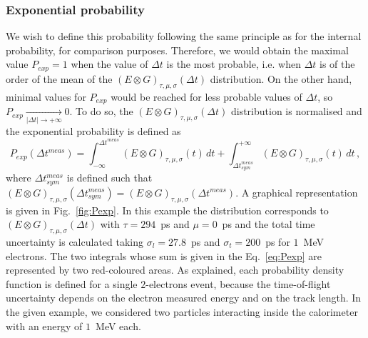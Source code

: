 
\subsubsection{Exponential probability}

We wish to define this probability following the same principle as for the internal probability, for comparison purposes.
Therefore, we would obtain the maximal value ${P_{exp}=1}$ when the value of $\Delta t$ is the most probable, i.e. when $\Delta t$ is of the order of the mean of the ${(E \otimes G)_{\tau,\mu,\sigma}(\Delta t)}$ distribution.
On the other hand, minimal values for $P_{exp}$ would be reached for less probable values of $\Delta t$, so ${P_{exp} \xrightarrow[|\Delta t| \rightarrow +\infty]{} 0}$.
To do so, the ${(E \otimes G)_{\tau,\mu,\sigma}(\Delta t)}$ distribution is normalised and the exponential probability is defined as
\begin{equation}
  P_{exp}(\Delta t^{meas}) = \int_{-\infty}^{\Delta t^{meas}} (E \otimes G)_{\tau,\mu,\sigma}(t)\, dt + \int_{\Delta t_{sym}^{meas}}^{+\infty} (E \otimes G)_{\tau,\mu,\sigma}(t)\, dt\,,
  \label{eq:Pexp}
\end{equation}
where $\Delta t^{meas}_{sym}$ is defined such that ${(E \otimes G)_{\tau,\mu,\sigma}(\Delta t^{meas}_{sym})} = {(E \otimes G)_{\tau,\mu,\sigma}(\Delta t^{meas})}$.
A graphical representation is given in Fig.~\ref{fig:Pexp}.
In this example the distribution corresponds to ${(E \otimes G)_{\tau,\mu,\sigma}(\Delta t)}$ with ${\tau=294}$~ps and ${\mu=0}$~ps and the total time uncertainty is calculated taking $\sigma_{l}=27.8$~ps and $\sigma_{t}=200$~ps for $1$~MeV electrons.
The two integrals whose sum is given in the Eq.~\eqref{eq:Pexp} are represented by two red-coloured areas.
As explained, each probability density function is defined for a single $2$-electrons event, because the time-of-flight uncertainty depends on the electron measured energy and on the track length.
In the given example, we considered two particles interacting inside the calorimeter with an energy of $1$~MeV each.
